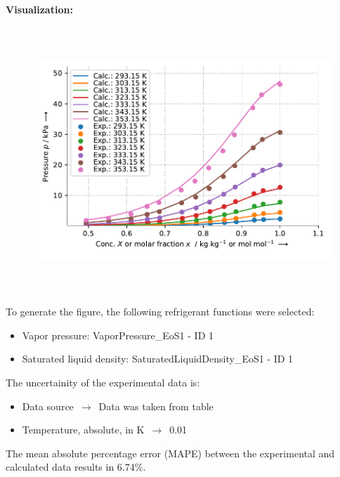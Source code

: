 \textbf{Visualization:}
%
\begin{figure}[!htp]
{\noindent\includegraphics[height=10cm, keepaspectratio]{figs/abs/abs_Water_ionic_liquid_[EMIM][OAc]_NrtlFixedDg_1.pdf}}
\end{figure}
%

To generate the figure, the following refrigerant functions were selected:
\begin{itemize}
\item Vapor pressure: VaporPressure\_EoS1 - ID 1
\item Saturated liquid density: SaturatedLiquidDensity\_EoS1 - ID 1
\end{itemize}

The uncertainity of the experimental data is:
\begin{itemize}
\item Data source $\,\to\,$ Data was taken from table
\item Temperature, absolute, in $\si{\kelvin}$ $\,\to\,$ 0.01
\end{itemize}

The mean absolute percentage error (MAPE) between the experimental and calculated data results in 6.74\%.
\FloatBarrier
\newpage
